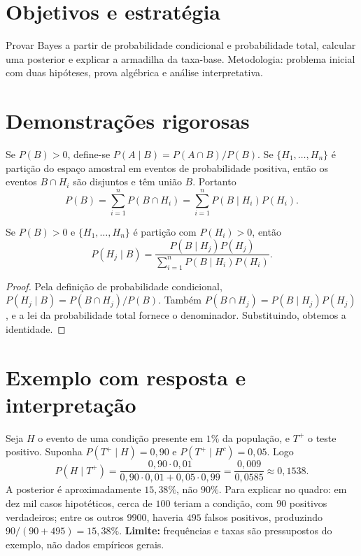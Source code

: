 \documentclass[11pt,a4paper]{article}
\begin{document}
\section{Objetivos e estratégia}
Provar Bayes a partir de probabilidade condicional e probabilidade total, calcular uma posterior e explicar a armadilha da taxa-base. Metodologia: problema inicial com duas hipóteses, prova algébrica e análise interpretativa.
\section{Demonstrações rigorosas}
Se $P(B)>0$, define-se $P(A\mid B)=P(A\cap B)/P(B)$. Se $\{H_1,\dots,H_n\}$ é partição do espaço amostral em eventos de probabilidade positiva, então os eventos $B\cap H_i$ são disjuntos e têm união $B$. Portanto
\[
P(B)=\sum_{i=1}^nP(B\cap H_i)
=\sum_{i=1}^nP(B\mid H_i)P(H_i).
\]
\begin{teorema}[Bayes]
Se $P(B)>0$ e $\{H_1,\dots,H_n\}$ é partição com $P(H_i)>0$, então
\[
P(H_j\mid B)=
\frac{P(B\mid H_j)P(H_j)}
{\sum_{i=1}^{n}P(B\mid H_i)P(H_i)}.
\]
\end{teorema}
\begin{proof}
Pela definição de probabilidade condicional,
$P(H_j\mid B)=P(B\cap H_j)/P(B)$.
Também $P(B\cap H_j)=P(B\mid H_j)P(H_j)$, e a lei da probabilidade total fornece o denominador. Substituindo, obtemos a identidade.
\end{proof}
\section{Exemplo com resposta e interpretação}
Seja $H$ o evento de uma condição presente em $1\%$ da população, e $T^+$ o teste positivo. Suponha $P(T^+\mid H)=0{,}90$ e $P(T^+\mid H^c)=0{,}05$. Logo
\[
P(H\mid T^+)=
\frac{0{,}90\cdot0{,}01}
{0{,}90\cdot0{,}01+0{,}05\cdot0{,}99}
=\frac{0{,}009}{0{,}0585}\approx0{,}1538.
\]
A posterior é aproximadamente $15{,}38\%$, não $90\%$. Para explicar no quadro: em dez mil casos hipotéticos, cerca de $100$ teriam a condição, com $90$ positivos verdadeiros; entre os outros $9900$, haveria $495$ falsos positivos, produzindo $90/(90+495)=15{,}38\%$. \textbf{Limite:} frequências e taxas são pressupostos do exemplo, não dados empíricos gerais.
\end{document}
